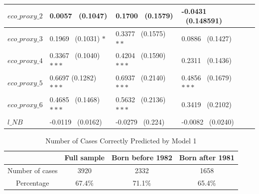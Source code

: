 \documentclass[12pt]{article}
\begin{document}
\begin{table} [H]
\begin{center}
\begin{tabular}{l|l|l|l p{}}
\hline
$eco\_{proxy}\_{2}$&0.0057 \ (0.1047)&0.1700 \ (0.1579)&-0.0431 \ (0.148591)\\
\hline
$eco\_{proxy}\_{3}$&0.1969 \ (0.1031) $\ast$&0.3377 \ (0.1575) $\ast\ast$&0.0886 \ (0.1427)\\
\hline
$eco\_{proxy}\_{4}$&0.3367 \ (0.1040) $\ast\ast\ast$&0.4204 \ (0.1590) $\ast\ast\ast$&0.2311 \ (0.1436)\\
\hline
$eco\_{proxy}\_{5}$&0.6697 (0.1282) $\ast\ast\ast$&0.6937 \ (0.2140) $\ast\ast\ast$&0.4856 \ (0.1679) $\ast\ast\ast$\\
\hline
$eco\_{proxy}\_{6}$&0.4685 \ (0.1468) $\ast\ast\ast$&0.5632 \ (0.2136) $\ast\ast\ast$&0.3419 \ (0.2102)\\
\hline
$l\_{NB}$&-0.0119 \ (0.0162)&-0.0279 \ (0.224)&-0.0082 \ (0.0240)\\
\hline

\end{tabular}
\end{center}
  \label{models}
\end{table}

\begin{table}[H]
\caption{Number of Cases Correctly Predicted by Model 1}
\begin{center}
\begin{tabular}{cccc}
&Full sample&Born before 1982&Born after 1981\\
\hline
\hline
Number of cases&3920&2332&1658\\
Percentage&67.4\%&71.1\%&65.4\%\\
\end{tabular}
\end{center}
\label{predicted}
\end{table}
\end{document}
